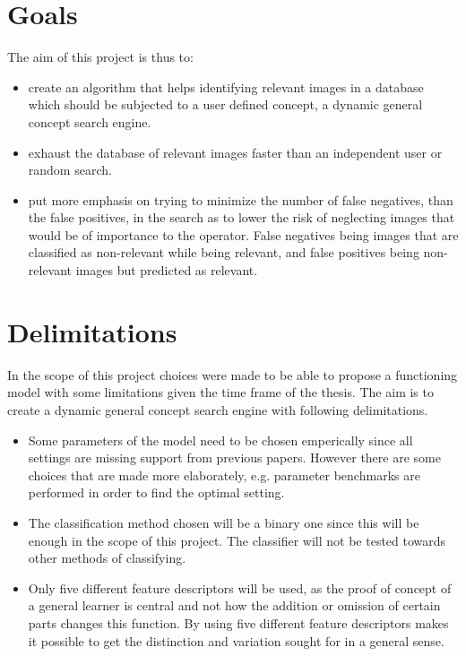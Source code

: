 \section{Goals}
\label{sec:intro:goals}
The aim of this project is thus to:
\begin{itemize} 
	\item create an algorithm that helps identifying relevant images in a database which should be subjected to a user defined concept, a dynamic general concept search engine. 
	\item exhaust the database of relevant images faster than an independent user or random search. 
	\item put more emphasis on trying to minimize the number of false negatives, than the false positives, in the search as to lower the risk of neglecting images that would be of importance to the operator. False negatives being images that are classified as non-relevant while being relevant, and false positives being non-relevant images but predicted as relevant. 
\end{itemize}

\section{Delimitations}
\label{sec:intro:delimitations}
In the scope of this project choices were made to be able to propose a functioning model with some limitations given the time frame of the thesis. The aim is to create a dynamic general concept search engine with following delimitations.
\begin{itemize}
	\item Some parameters of the model need to be chosen emperically since all settings are missing support from previous papers. However there are some choices that are made more elaborately, e.g. parameter benchmarks are performed in order to find the optimal setting. 
	\item The classification method chosen will be a binary one since this will be enough in the scope of this project. The classifier will not be tested towards other methods of classifying.
	\item Only five different feature descriptors will be used, as the proof of concept of a general learner is central and not how the addition or omission of certain parts changes this function. By using five different feature descriptors makes it possible to get the distinction and variation sought for in a general sense.
\end{itemize}

